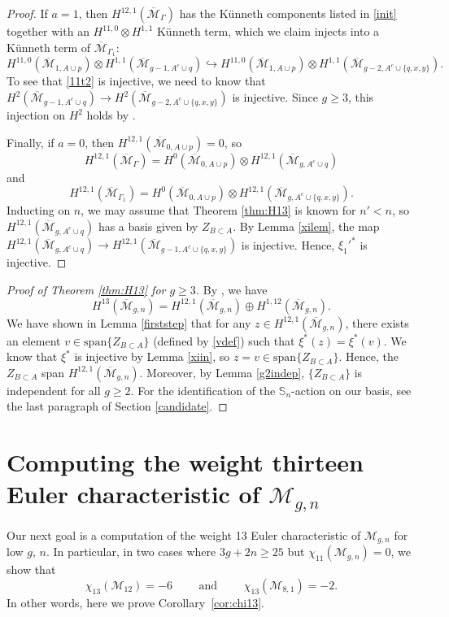 \documentclass[12pt]{amsart}
\theoremstyle{definition}
\numberwithin{equation}{section}
\newcommand{\M}{\mathcal{M}}
\newcommand{\cM}{\mathcal{M}}
\newcommand{\Mb}{\overline{\M}}
\theoremstyle{definition} %
\theoremstyle{remark}
\begin{document}
\begin{proof}
If $a = 1$, then $H^{12,1}(\Mb_{\Gamma})$ has the K\"unneth components listed in \eqref{init} together with an $H^{11,0} \otimes H^{1,1}$ K\"unneth term, which we claim injects into a K\"unneth term of $\Mb_{\Gamma_1}$:
\begin{equation} \label{11t2}
H^{11,0}(\Mb_{1,A \cup p}) \otimes H^{1,1}(\Mb_{g-1,A^c \cup q}) \hookrightarrow H^{11,0}(\Mb_{1,A \cup p}) \otimes H^{1,1}(\Mb_{g-2,A^c \cup \{q, x, y\}}). %
\end{equation}
To see that \eqref{11t2} is injective, we need to know that $H^2(\Mb_{g-1,A^c \cup q}) \to H^2(\Mb_{g-2,A^c \cup \{q, x, y\}})$ is injective. Since $g \geq 3$, this injection on $H^2$ holds by \cite[Theorem 2.10]{ArbarelloCornalba}.

Finally, if $a = 0$, then $H^{12,1}(\Mb_{0,A \cup p}) = 0$, so
\[H^{12,1}(\Mb_{\Gamma}) = H^0(\Mb_{0,A \cup p}) \otimes H^{12,1}(\Mb_{g, A^c \cup q})\]
and
\[H^{12,1}(\Mb_{\Gamma_1}) = H^0(\Mb_{0, A \cup p}) \otimes H^{12,1}(\Mb_{g,A^c \cup \{q, x, y\}}).\]
Inducting on $n$, we may assume that Theorem \ref{thm:H13} is known for $n' < n$, so
$H^{12,1}(\Mb_{g, A^c \cup q})$ has a basis given by $Z_{B \subset A}$. By Lemma \ref{xilem}, the map $H^{12,1}(\Mb_{g,A^c \cup q}) \to H^{12,1}(\Mb_{g-1,A^c \cup \{q, x, y\}})$ is injective. Hence, $\xi_1'^*$ is injective.
\end{proof}

\begin{proof}[Proof of Theorem \ref{thm:H13} for $g \geq 3$]
By \cite[Theorem 1.1]{CLP-STE}, we have
\[
H^{13}(\Mb_{g,n})= H^{12,1}(\Mb_{g,n})\oplus H^{1,12}(\Mb_{g,n}).
\]
We have shown in Lemma \ref{firststep} that for any $z \in H^{12,1}(\Mb_{g,n})$, there exists an element $v \in \mathrm{span}\{Z_{B \subset A}\}$ (defined by \eqref{vdef}) such that $\xi^*(z) = \xi^*(v)$. We know that $\xi^*$ is injective by Lemma \ref{xiin}, so $z = v \in \mathrm{span}\{Z_{B \subset A}\}$. Hence, the $Z_{B \subset A}$ span $H^{12,1}(\Mb_{g,n})$. Moreover, by Lemma \ref{g2indep}, $\{Z_{B \subset A}\}$ is independent for all $g \geq 2$.
For the identification of the $\mathbb{S}_n$-action on our basis, see the last paragraph of Section \ref{candidate}.
\end{proof}

\section{Computing the weight thirteen Euler characteristic of \texorpdfstring{$\cM_{g,n}$}{Mgn}}
\label{sec:GK13}
Our next goal is a computation of the weight 13 Euler characteristic  of $\M_{g,n}$ for low $g$, $n$. In particular, in two cases where $3g + 2n \geq 25$ but $\chi_{11}(\cM_{g,n}) = 0$, we show that 
\[
\chi_{13}(\cM_{12}) =-6 \qquad \text{ and } \qquad \chi_{13}(\cM_{8,1}) =-2.
\]
In other words, here we prove Corollary~\ref{cor:chi13}.
\end{document}
